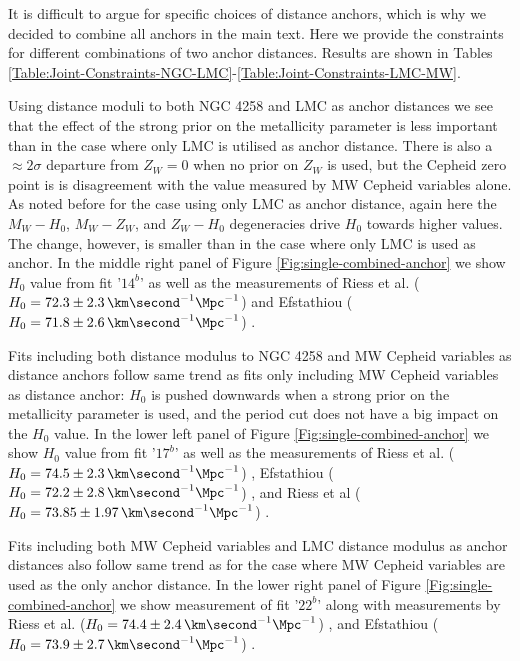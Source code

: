 It is difficult to argue for specific choices of distance anchors, which is why we decided to combine all
anchors in the main text. Here we provide the constraints for different combinations of two anchor distances. Results are shown in Tables \ref{Table:Joint-Constraints-NGC-LMC}-\ref{Table:Joint-Constraints-LMC-MW}. 

Using distance moduli to both NGC 4258 and LMC as anchor distances we see that the effect of the strong prior on the metallicity parameter is less important than in the case where only LMC is utilised as anchor distance. There is also a $\approx 2\sigma$ departure from $Z_W=0$ when no prior on $Z_W$ is used, but the Cepheid zero point is is disagreement with the value measured by MW Cepheid variables alone. As noted before for the case using only LMC as anchor distance, again here the $M_W-H_0$, $M_W-Z_W$, and $Z_W-H_0$ degeneracies drive $H_0$ towards higher values. The change, however, is smaller than in the case where only LMC is used as anchor. In the middle right panel of Figure \ref{Fig:single-combined-anchor} we show $H_0$ value from fit '$14^b$' as well as the measurements of Riess et al. ($H_0=72.3\pm 2.3 \, \km \second^{-1} \Mpc^{-1}$) \cite{Riess:2011yx} and Efstathiou ($H_0=71.8\pm 2.6 \, \km \second^{-1} \Mpc^{-1}$) \cite{Efstathiou:2013via}.

Fits including both distance modulus to NGC 4258 and MW Cepheid variables as distance anchors follow same trend as fits only including MW Cepheid variables as distance anchor: $H_0$ is pushed downwards when a strong prior on the metallicity parameter is used, and the period cut does not have a big impact on the $H_0$ value. In the lower left panel of Figure \ref{Fig:single-combined-anchor} we show $H_0$ value from fit '$17^b$' as well as the measurements of Riess et al. ($H_0=74.5\pm 2.3 \, \km \second^{-1} \Mpc^{-1}$) \cite{Riess:2011yx}, Efstathiou ($H_0=72.2\pm 2.8 \, \km \second^{-1} \Mpc^{-1}$) \cite{Efstathiou:2013via}, and Riess et al ($H_0=73.85\pm 1.97 \, \km \second^{-1} \Mpc^{-1}$) \cite{Riess:2016jrr}.

Fits including both MW Cepheid variables and LMC distance modulus as anchor distances also follow same trend as for the case where MW Cepheid variables are used as the only anchor distance. In the lower right panel of Figure \ref{Fig:single-combined-anchor} we show measurement of fit '$22^b$' along with measurements by Riess et al. ($H_0=74.4\pm 2.4 \, \km \second^{-1} \Mpc^{-1}$) \cite{Riess:2011yx}, and Efstathiou ($H_0=73.9\pm 2.7 \, \km \second^{-1} \Mpc^{-1}$) \cite{Efstathiou:2013via}.
 
